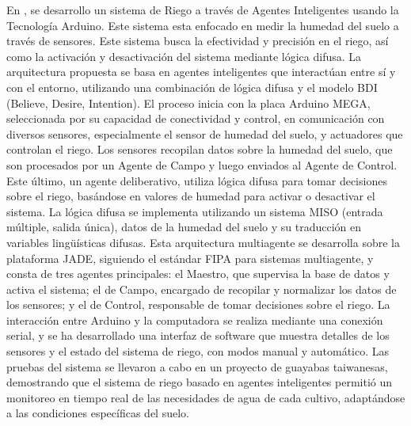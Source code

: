 \bigbreak
En \cite{salazar_irrigation_2013}, se desarrollo un sistema de Riego a través de Agentes Inteligentes usando la Tecnología Arduino. Este sistema esta enfocado en medir la humedad del suelo a través de sensores. Este sistema busca la efectividad y precisión en el riego, así como la activación y desactivación del sistema mediante lógica difusa. La arquitectura propuesta se basa en agentes inteligentes que interactúan entre sí y con el entorno, utilizando una combinación de lógica difusa y el modelo BDI (Believe, Desire, Intention). El proceso inicia con la placa Arduino MEGA, seleccionada por su capacidad de conectividad y control, en comunicación con diversos sensores, especialmente el sensor de humedad del suelo, y actuadores que controlan el riego. Los sensores recopilan datos sobre la humedad del suelo, que son procesados por un Agente de Campo y luego enviados al Agente de Control. Este último, un agente deliberativo, utiliza lógica difusa para tomar decisiones sobre el riego, basándose en valores de humedad para activar o desactivar el sistema. La lógica difusa se implementa utilizando un sistema MISO (entrada múltiple, salida única), datos de la humedad del suelo y su traducción en variables lingüísticas difusas. Esta arquitectura multiagente se desarrolla sobre la plataforma JADE, siguiendo el estándar FIPA para sistemas multiagente, y consta de tres agentes principales: el Maestro, que supervisa la base de datos y activa el sistema; el de Campo, encargado de recopilar y normalizar los datos de los sensores; y el de Control, responsable de tomar decisiones sobre el riego. La interacción entre Arduino y la computadora se realiza mediante una conexión serial, y se ha desarrollado una interfaz de software que muestra detalles de los sensores y el estado del sistema de riego, con modos manual y automático. Las pruebas del sistema se llevaron a cabo en un proyecto de guayabas taiwanesas, demostrando que el sistema de riego basado en agentes inteligentes permitió un monitoreo en tiempo real de las necesidades de agua de cada cultivo, adaptándose a las condiciones específicas del suelo.

